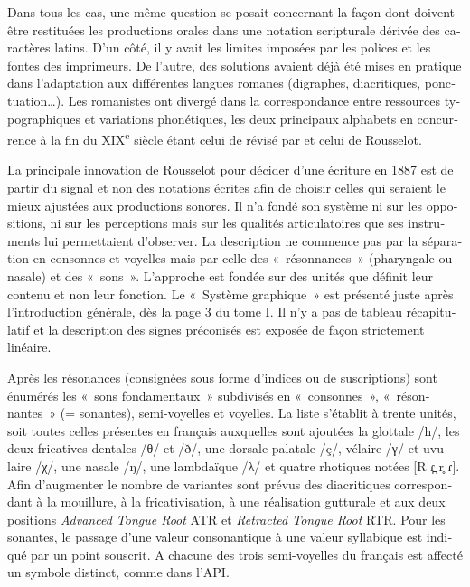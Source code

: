 \documentclass[french,output=paper,colorlinks,citecolor=brown]{../langscibook}
\begin{document}
\begin{otherlanguage}{french}
Dans tous les cas, une même question se posait concernant la façon dont doivent être restituées les productions orales dans une notation scripturale dérivée des caractères latins. D’un côté, il y avait les limites imposées par les polices et les fontes des imprimeurs. De l’autre, des solutions avaient déjà été mises en pratique dans l’adaptation aux différentes langues romanes (digraphes, diacritiques, ponctuation…). Les romanistes ont divergé dans la correspondance entre ressources typographiques et variations phonétiques, les deux principaux alphabets en concurrence à la fin du XIX\textsuperscript{e} siècle étant celui de \citet{Böhmer1871} révisé par \citet{Ascoli1873} et celui de Rousselot.

La principale innovation de Rousselot pour décider d’une écriture en 1887 est de partir du signal et non des notations écrites afin de choisir celles qui seraient le mieux ajustées aux productions sonores. Il n’a fondé son système ni sur les oppositions, ni sur les perceptions mais sur les qualités articulatoires que ses instruments lui permettaient d’observer. La description ne commence pas par la séparation en consonnes et voyelles mais par celle des «~résonnances~» (pharyngale ou nasale) et des «~sons~». L’approche est fondée sur des unités que définit leur contenu et non leur fonction. Le «~Système graphique~» est présenté juste après l’introduction générale, dès la page 3 du tome I. Il n’y a pas de tableau récapitulatif et la description des signes préconisés est exposée de façon strictement linéaire.

Après les résonances (consignées sous forme d’indices ou de suscriptions) sont énumérés les «~sons fondamentaux~» subdivisés en «~consonnes~», «~résonnantes~» (= sonantes), semi-voyelles et voyelles. La liste s’établit à trente unités, soit toutes celles présentes en français auxquelles sont ajoutées la glottale /h/, les deux fricatives dentales /θ/ et /ð/, une dorsale palatale /ç/, vélaire /γ/ et uvulaire /χ/, une nasale /ŋ/, une lambdaïque /λ/ et quatre rhotiques notées [R \textlatin{ɾ}\textlatin{̪} r\textlatin{̥} \textlatin{ɾ}]. Afin d’augmenter le nombre de variantes sont prévus des diacritiques correspondant à la mouillure, à la fricativisation, à une réalisation gutturale et aux deux positions \textit{Advanced Tongue Root} ATR et \textit{Retracted Tongue Root} RTR. Pour les sonantes, le passage d’une valeur consonantique à une valeur syllabique est indiqué par un point souscrit. A chacune des trois semi-voyelles du français est affecté un symbole distinct, comme dans l’API.


\end{otherlanguage}
\end{document}
